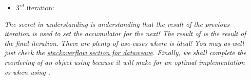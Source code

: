 \begin{enumerate}[resume*]
\begin{itemize}
  \item $3^{rd}$ iteration: 
  \end{itemize}
  \emph{
    The secret in understanding  is understanding that the result of the previous iteration is used to set the accumulator for the next!  The result of  is the result of the final iteration.
    \newline
    There are plenty of use-cases where  is ideal!  You may as well just check the \href{https://stackoverflow.com/questions/tagged/dataweave}{stackoverflow section for dataweave}.  Finally, we shall complete the reordering of an object using  because it will make for an optimal implementation vs when using . 
  }
\end{enumerate}

